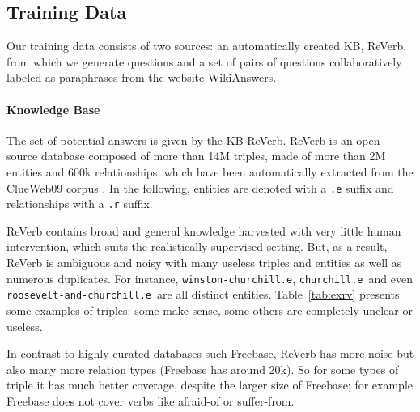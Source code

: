 \documentclass[runningheads,a4paper]{llncs}
\newcommand{\kb}[1]{{\small\texttt{#1}}\xspace}
\newcommand{\fb}{{\sc Freebase}\xspace}
\newcommand{\rv}{{\sc ReVerb}\xspace}
\newcommand{\wk}{{\sc WikiAnswers}\xspace}
\begin{document}
\subsection{Training Data}

Our training data consists of two sources: an automatically created KB, \rv,  from which we generate questions and a set of pairs of questions collaboratively labeled as paraphrases from the website \wk.


\paragraph{Knowledge Base}
The set of potential answers  is given by the KB \rv \cite{ReVerb2011}.
\rv is an open-source database composed of more than 14M triples, made of more 
than 2M entities and 600k relationships, which have been automatically extracted from 
the ClueWeb09 corpus \cite{pomikalek2012building}. In the following, entities are denoted with a \kb{.e} suffix and relationships with a \kb{.r} suffix. 

\rv contains broad and general knowledge harvested with very little human intervention, which suits the realistically supervised setting. 
But, as a result, \rv is ambiguous and noisy with many useless triples and entities as well as numerous duplicates. For instance, \kb{winston-churchill.e}, \kb{churchill.e} and even \kb{roosevelt-and-churchill.e} are all distinct entities.
Table~\ref{tab:exrv} presents some examples of triples: some make sense, some others are completely unclear or useless. 

In contrast to highly curated databases such \fb, \rv has more noise but also many more relation types (\fb has around 20k). So for some types of triple it has much better coverage, despite the larger size of \fb; for example \fb does not cover verbs like afraid-of or suffer-from.
\end{document}
